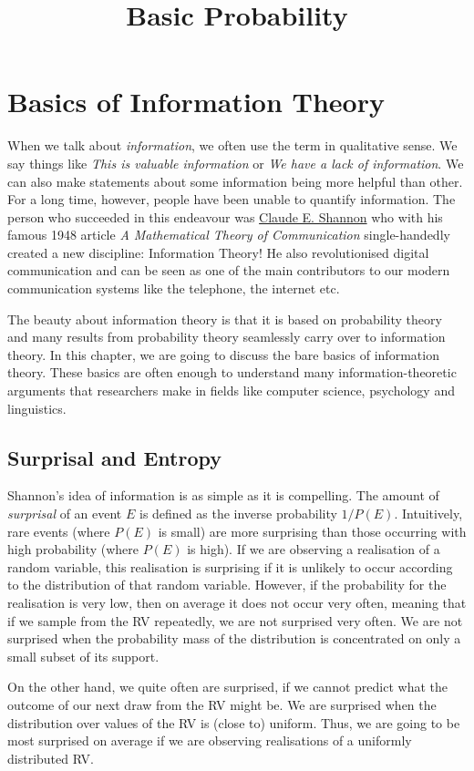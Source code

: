 \documentclass[a4paper,11pt,leqno]{report}\usepackage[]{graphicx}\usepackage[]{color}
\title{Basic Probability}
\date{}
\begin{document}
\setcounter{chapter}{6}

\chapter{Basics of Information Theory}

When we talk about \textit{information}, we often use the term in qualitative sense. We say things like 
\textit{This is valuable information} or 
\textit{We have a lack of information}. We can also make statements about some information being more helpful than other. For a long time, however,
people have been unable to quantify information. The person who succeeded in this endeavour was \href{https://en.wikipedia.org/wiki/Claude_Shannon}{Claude E. Shannon}
who with his famous 1948 article \textit{A Mathematical Theory of Communication} single-handedly created a new discipline: Information Theory! He also revolutionised
digital communication and can be seen as one of the main contributors to our modern communication systems like the telephone, the internet etc. 

The beauty about information theory is that it is based on probability theory and many results from probability theory seamlessly carry over to information theory.
In this chapter, we are going to discuss the bare basics of information theory. These basics are often enough to understand many information-theoretic arguments
that researchers make in fields like computer science, psychology and linguistics.

\section{Surprisal and Entropy}
Shannon's idea of information is as simple as it is compelling. The amount of \emph{surprisal} of an event $E$ is defined as the inverse probability $1/P(E)$. Intuitively, rare events (where $P(E)$ is small) are more surprising than those occurring with high probability (where $P(E)$ is high). If we are observing a realisation of a random variable, this realisation is surprising if it is unlikely to occur according to the distribution of that random variable. However, if the probability for the realisation is very low, then on average it does not occur very often, meaning that if we sample from the RV repeatedly, we are not surprised very often. We are not surprised when the probability mass of the distribution is concentrated on only a small subset of its support. 

On the other hand, we quite often are surprised, if we cannot predict what the outcome of our next draw from the RV might be. We are surprised when the distribution over values of the RV is (close to) uniform. Thus, we are going to be most surprised on average if we are observing realisations of a uniformly distributed RV.
\end{document}
